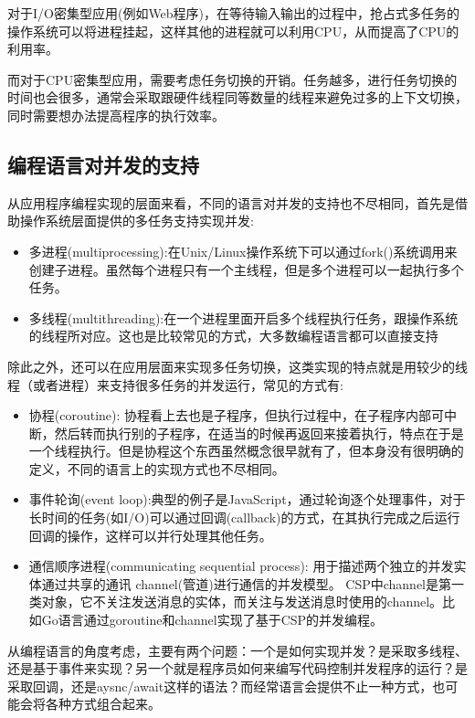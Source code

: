 \documentclass[12pt]{article}
\begin{document}
对于I/O密集型应用(例如Web程序)，在等待输入输出的过程中，抢占式多任务的操作系统可以将进程挂起，这样其他的进程就可以利用CPU，从而提高了CPU的利用率。

而对于CPU密集型应用，需要考虑任务切换的开销。任务越多，进行任务切换的时间也会很多，通常会采取跟硬件线程同等数量的线程来避免过多的上下文切换，同时需要想办法提高程序的执行效率。

\subsection{编程语言对并发的支持}\label{ux7f16ux7a0bux8bedux8a00ux5bf9ux5e76ux53d1ux7684ux652fux6301}

从应用程序编程实现的层面来看，不同的语言对并发的支持也不尽相同，首先是借助操作系统层面提供的多任务支持实现并发:

\begin{itemize}
\tightlist
\item
  多进程(multiprocessing):在Unix/Linux操作系统下可以通过fork()系统调用来创建子进程。虽然每个进程只有一个主线程，但是多个进程可以一起执行多个任务。
\item
  多线程(multithreading):在一个进程里面开启多个线程执行任务，跟操作系统的线程所对应。这也是比较常见的方式，大多数编程语言都可以直接支持
\end{itemize}

除此之外，还可以在应用层面来实现多任务切换，这类实现的特点就是用较少的线程（或者进程）来支持很多任务的并发运行，常见的方式有:

\begin{itemize}
\tightlist
\item
  协程(coroutine): 协程看上去也是子程序，但执行过程中，在子程序内部可中断，然后转而执行别的子程序，在适当的时候再返回来接着执行，特点在于是一个线程执行。但是协程这个东西虽然概念很早就有了，但本身没有很明确的定义，不同的语言上的实现方式也不尽相同。
\item
  事件轮询(event loop):典型的例子是JavaScript，通过轮询逐个处理事件，对于长时间的任务(如I/O)可以通过回调(callback)的方式，在其执行完成之后运行回调的操作，这样可以并行处理其他任务。
\item
  通信顺序进程(communicating sequential process): 用于描述两个独立的并发实体通过共享的通讯 channel(管道)进行通信的并发模型。 CSP中channel是第一类对象，它不关注发送消息的实体，而关注与发送消息时使用的channel。比如Go语言通过goroutine和channel实现了基于CSP的并发编程。
\end{itemize}

从编程语言的角度考虑，主要有两个问题：一个是如何实现并发？是采取多线程、还是基于事件来实现？另一个就是程序员如何来编写代码控制并发程序的运行？是采取回调，还是aysnc/await这样的语法？而经常语言会提供不止一种方式，也可能会将各种方式组合起来。
\end{document}
